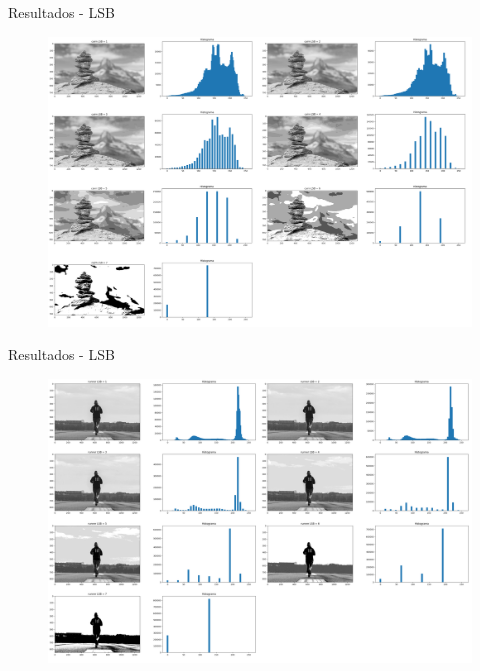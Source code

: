 \documentclass[]{beamer}
\begin{document}
\begin{frame}{Resultados - LSB}
    \begin{figure}
        \includegraphics[scale=0.16]{Imagens/resultados-cairn-lsb.png}
    \end{figure}  
\end{frame}

\begin{frame}{Resultados - LSB}
    \begin{figure}
        \includegraphics[scale=0.16]{Imagens/resultados-runner-lsb.png}
    \end{figure}  
\end{frame}
\end{document}
